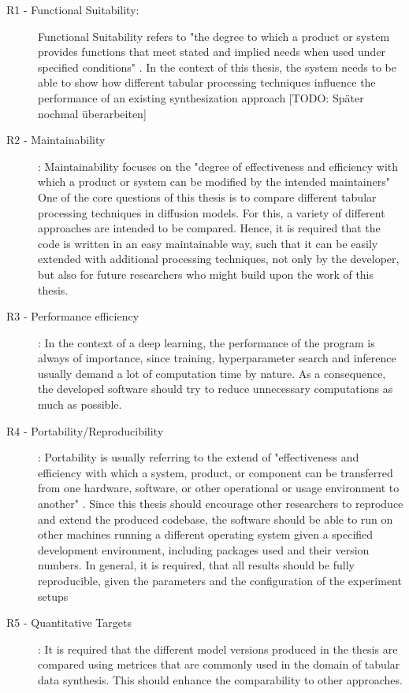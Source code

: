 \begin{description}
    \item[R1 - Functional Suitability:]
    Functional Suitability refers to "the degree to which a product or system provides functions that meet stated and implied needs when used under specified conditions" \cite[p. 219]{bass2013SoftwareArchitecturePractice}.
    In the context of this thesis, the system needs to be able to show how different tabular processing techniques influence the performance of an existing synthesization approach [TODO: Später nochmal überarbeiten]

    \item[R2 - Maintainability]:
    Maintainability focuses on the "degree of effectiveness and efficiency with which a product or system can be modified by the intended maintainers" \cite[p. 220]{bass2013SoftwareArchitecturePractice}
    One of the core questions of this thesis is to compare different tabular processing techniques in diffusion models.
    For this, a variety of different approaches are intended to be compared.
    Hence, it is required that the code is written in an easy maintainable way, such that it can be easily extended with additional processing techniques, not only by the developer, 
    but also for future researchers who might build upon the work of this thesis.

    \item[R3 - Performance efficiency]:
    In the context of a deep learning, the performance of the program is always of importance, since training, hyperparameter search and inference usually demand a lot of computation time by nature.
    As a consequence, the developed software should try to reduce unnecessary computations as much as possible.

    \item[R4 - Portability/Reproducibility]:
    Portability is usually referring to the extend of "effectiveness and efficiency with which a system, product, or component can be transferred from one hardware, software, 
    or other operational or usage environment to another" \cite[p. 220]{bass2013SoftwareArchitecturePractice}.
    Since this thesis should encourage other researchers to reproduce and extend the produced codebase, the software should be able to run on other machines running a different operating system given a specified development environment,
    including packages used and their version numbers.
    In general, it is required, that all results should be fully reproducible, given the parameters and the configuration of the experiment setups

    \item[R5 - Quantitative Targets]:
    It is required that the different model versions produced in the thesis are compared using metrices that are commonly used in the domain of tabular data synthesis.
    This should enhance the comparability to other approaches.
\end{description}


